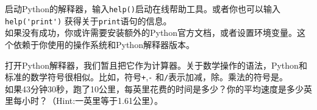 \documentclass[10pt]{book}
\begin{document}
\begin{ex}
启动Python的解释器，输入{\tt help()}启动在线帮助工具。或者你也可以输入\verb"help('print')" 获得关于{\tt print}语句的信息。\\

如果没有成功，你或许需要安装额外的Python官方文档，或者设置环境变量。这个依赖于你使用的操作系统和Python解释器版本。

\end{ex}


\begin{ex}
打开Python解释器，我们暂且把它作为计算器。关于数学操作的语法，Python和标准的数学符号很相似。比如，符号{\tt +},{\tt -} 和{\tt /}表示加减，除。乘法的符号是{\tt *}。\\

如果43分钟30秒，跑了10公里，每英里花费的时间是多少？你的平均速度是多少英里每小时？（Hint:一英里等于1.61公里）。

\end{ex}
\end{document}
